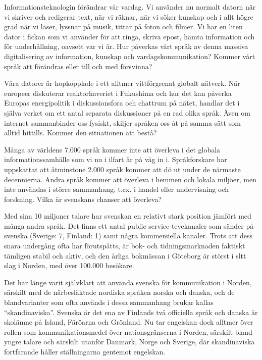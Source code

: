 \frenchspacing
\begin{multicols}{2}

Informationsteknologin förändrar vår vardag. Vi använder nu normalt
datorn när vi skriver och redigerar text, när vi räknar, när vi söker
kunskap och i allt högre grad när vi läser, lyssnar på musik, tittar
på \mbox{foton} och filmer. Vi har en liten dator i fickan som vi använder
för att ringa, skriva epost, hämta information och för underhållning,
oavsett var vi är. Hur påverkas vårt språk av denna massiva
digitalisering av information, kunskap och vardagskommunikation?
Kommer vårt språk att förändras eller till och med försvinna?

Våra datorer är hopkopplade i ett alltmer vittförgrenat globalt
nätverk. När europeer diskuterar reaktorhaveriet i Fukushima och hur
det kan på\-verka \mbox{Europas} energipolitik i diskussionsfora och chattrum
på nätet, handlar det i själva verket om ett \mbox{antal} separata
diskussioner på en rad olika språk. Även om internet sammanbinder oss
fysiskt, skiljer språken oss åt på samma sätt som alltid
hittills. Kommer den situationen att bestå?

Många av världens 7.000 språk kommer inte att överleva i det globala
informationssamhälle som vi nu i ilfart är på väg in i. Språkforskare
har uppskattat att åtminstone 2.000 språk kommer att dö ut under de
närmaste decennierna. Andra språk kommer att överleva i hemmen och
lokala miljöer, men \mbox{inte} användas i större sammanhang, t.ex. i handel
\mbox{eller} under\-visning och forskning. Vilka är svenskans chanser att
överleva?

Med sina 10 miljoner talare har svenskan en relativt stark position
jämfört med många andra språk. Det finns ett antal public
service-tevekanaler som \mbox{sänder} på svenska (Sverige: 7, Finland: 1)
samt \mbox{några} kommersiella kanaler. Trots att dess snara undergång \mbox{ofta}
har förutspåtts, är bok- och tidningsmarknaden faktiskt tämligen
stabil och aktiv, och den årliga bokmässan i Göteborg är störst i sltt %
slag i Norden, med över 100.000 besökare.

Det har länge varit självklart att använda svenska för kommunikation i
Norden, särskilt med de närbesläktade nordiska språken norska och
danska, och de blandvarianter som ofta används i dessa sammanhang
brukar kallas ``skandinaviska''. Svenska är det ena av Finlands två
officiella språk och danska är skolämne på Island, Färöarna och
Grönland. Nu tar engelskan dock alltmer över rollen som
kommunikationsmedel över nationsgränserna i Norden, särskilt bland
yngre talare och särskilt utanför Danmark, Norge och Sverige, där
skandinaviska fort\-farande håller ställningarna gentemot engelskan.


\end{multicols}
